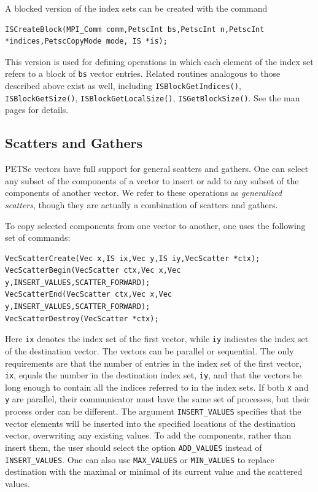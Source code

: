 A blocked version of the index sets can be created with the command
\begin{lstlisting}
ISCreateBlock(MPI_Comm comm,PetscInt bs,PetscInt n,PetscInt *indices,PetscCopyMode mode, IS *is);
\end{lstlisting}
This version is used for defining operations in which each element of the index
set refers to a block of \lstinline{bs} vector entries.  Related routines analogous
to those described above exist as well, including
\lstinline{ISBlockGetIndices()}, \lstinline{ISBlockGetSize()}, \lstinline{ISBlockGetLocalSize()}, \lstinline{ISGetBlockSize()}.
See the man pages for details.

\subsection{Scatters and Gathers}  
\label{sec_scatter}

PETSc vectors have full support for general scatters and
gathers. One can select any subset of the components of a vector to
insert or add to any subset of the components of another vector.
We refer to these operations as {\em generalized scatters}, though they are
actually a combination of scatters and gathers.

 
To copy selected components from one vector
to another, one uses the following set of commands:
\begin{lstlisting}
VecScatterCreate(Vec x,IS ix,Vec y,IS iy,VecScatter *ctx);
VecScatterBegin(VecScatter ctx,Vec x,Vec y,INSERT_VALUES,SCATTER_FORWARD);
VecScatterEnd(VecScatter ctx,Vec x,Vec y,INSERT_VALUES,SCATTER_FORWARD);
VecScatterDestroy(VecScatter *ctx);
\end{lstlisting}
Here \lstinline{ix} denotes the index set of the first vector, while \lstinline{iy}
indicates the index set of the destination vector.  The vectors
can be parallel or sequential. The only requirements are that the
number of entries in the index set of the first vector, \lstinline{ix},
equals the number in the destination index set, \lstinline{iy}, and that the
vectors be long enough to contain all the indices referred to in the
index sets. If both \lstinline{x} and \lstinline{y} are parallel,
their communicator must have the same set of processes, but their process order can be different.
The argument \lstinline{INSERT_VALUES} specifies that the
vector elements will be inserted into the specified locations of the
destination vector, overwriting any existing values.  To add the
components, rather than insert them, the user should select the option
\lstinline{ADD_VALUES} instead of \lstinline{INSERT_VALUES}.
One can also use \lstinline{MAX_VALUES} or \lstinline{MIN_VALUES} to
replace destination with the maximal or minimal of its current value and the scattered values.



